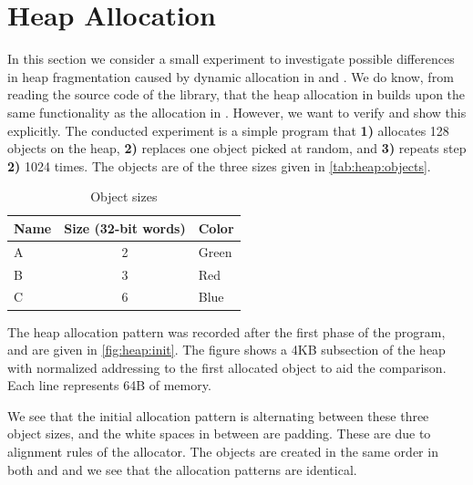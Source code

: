 \section{Heap Allocation}
\label{sec:res:heap}
In this section we consider a small experiment to investigate possible differences in heap fragmentation caused by dynamic allocation in {\C} and {\rust}.
We do know, from reading the source code of the library, that the heap allocation in {\rust} builds upon the same functionality as the allocation in {\C}.
However, we want to verify and show this explicitly.
The conducted experiment is a simple program that \textbf{1)} allocates 128 objects on the heap, \textbf{2)} replaces one object picked at random, and \textbf{3)} repeats step \textbf{2)} 1024 times.
The objects are of the three sizes given in \autoref{tab:heap:objects}.

\begin{table}[H]
  \centering
  \begin{tabular}{l|c|l}
    \textbf{Name} & \textbf{Size (32-bit words)} & \textbf{Color} \\
    \hline
    A & 2 & Green \\
    B & 3 & Red \\
    C & 6 & Blue \\
    \hline
  \end{tabular}
  \caption{Object sizes}
  \label{tab:heap:objects}
\end{table}

The heap allocation pattern was recorded after the first phase of the program, and are given in \autoref{fig:heap:init}.
The figure shows a 4KB subsection of the heap with normalized addressing to the first allocated object to aid the comparison.
Each line represents 64B of memory.

We see that the initial allocation pattern is alternating between these three object sizes, and the white spaces in between are padding.
These are due to alignment rules of the allocator.
The objects are created in the same order in both {\C} and {\rust} and we see that the allocation patterns are identical.

